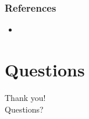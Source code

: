 \documentclass[aspectratio=169,11pt,hyperref={colorlinks=true}]{beamer}
\begin{document}
\begin{frame}
    \frametitle{References}
    \begin{itemize}
        \item{}
    \end{itemize}
\end{frame}


\section{Questions}
\begin{frame}[c]
    \begin{center}
        \Huge Thank you!\\Questions?
    \end{center}
\end{frame}
\end{document}
